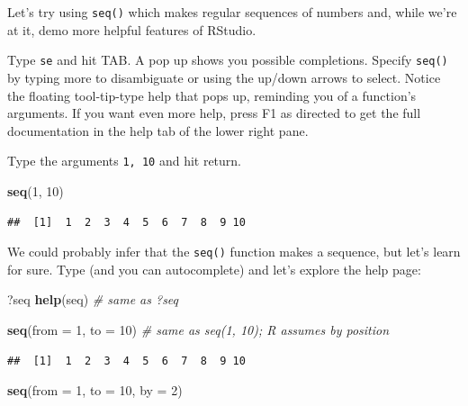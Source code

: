 \documentclass[]{book}
\newenvironment{Shaded}{\begin{snugshade}}{\end{snugshade}}
\newcommand{\KeywordTok}[1]{\textcolor[rgb]{0.13,0.29,0.53}{\textbf{{#1}}}}
\newcommand{\DataTypeTok}[1]{\textcolor[rgb]{0.13,0.29,0.53}{{#1}}}
\newcommand{\DecValTok}[1]{\textcolor[rgb]{0.00,0.00,0.81}{{#1}}}
\newcommand{\CommentTok}[1]{\textcolor[rgb]{0.56,0.35,0.01}{\textit{{#1}}}}
\newcommand{\NormalTok}[1]{{#1}}
\theoremstyle{definition}
\theoremstyle{definition}
\theoremstyle{definition}
\theoremstyle{remark}
\begin{document}
Let's try using \texttt{seq()} which makes regular sequences of numbers
and, while we're at it, demo more helpful features of RStudio.

Type \texttt{se} and hit TAB. A pop up shows you possible completions.
Specify \texttt{seq()} by typing more to disambiguate or using the
up/down arrows to select. Notice the floating tool-tip-type help that
pops up, reminding you of a function's arguments. If you want even more
help, press F1 as directed to get the full documentation in the help tab
of the lower right pane.

Type the arguments \texttt{1,\ 10} and hit return.

\begin{Shaded}
\begin{Highlighting}[]
\KeywordTok{seq}\NormalTok{(}\DecValTok{1}\NormalTok{, }\DecValTok{10}\NormalTok{)}
\end{Highlighting}
\end{Shaded}

\begin{verbatim}
##  [1]  1  2  3  4  5  6  7  8  9 10
\end{verbatim}

We could probably infer that the \texttt{seq()} function makes a
sequence, but let's learn for sure. Type (and you can autocomplete) and
let's explore the help page:

\begin{Shaded}
\begin{Highlighting}[]
\NormalTok{?seq }
\KeywordTok{help}\NormalTok{(seq) }\CommentTok{# same as ?seq}
\end{Highlighting}
\end{Shaded}

\begin{Shaded}
\begin{Highlighting}[]
\KeywordTok{seq}\NormalTok{(}\DataTypeTok{from =} \DecValTok{1}\NormalTok{, }\DataTypeTok{to =} \DecValTok{10}\NormalTok{) }\CommentTok{# same as seq(1, 10); R assumes by position}
\end{Highlighting}
\end{Shaded}

\begin{verbatim}
##  [1]  1  2  3  4  5  6  7  8  9 10
\end{verbatim}

\begin{Shaded}
\begin{Highlighting}[]
\KeywordTok{seq}\NormalTok{(}\DataTypeTok{from =} \DecValTok{1}\NormalTok{, }\DataTypeTok{to =} \DecValTok{10}\NormalTok{, }\DataTypeTok{by =} \DecValTok{2}\NormalTok{)}
\end{Highlighting}
\end{Shaded}
\end{document}
